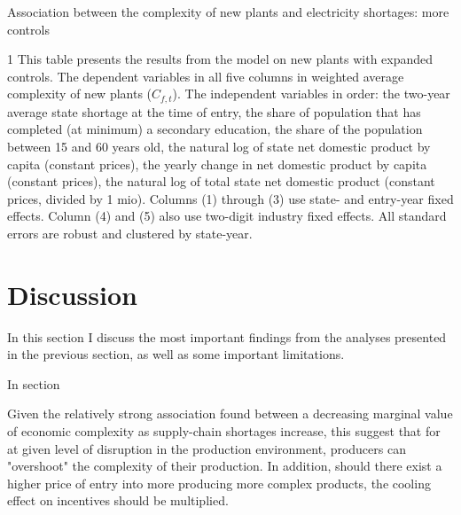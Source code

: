 \documentclass[11pt]{article}
\begin{document}
\begin{table} 
	\begin{center}
		\begin{threeparttable}
			\caption{Association between the complexity of new plants and electricity shortages: more controls}
			\label{tab:entry_max_avg}
			
			\begin{tablenotes} \footnotesize 
			\item[1] This table presents the results from the model on new plants with expanded controls. The dependent variables in all five columns in weighted average complexity of new plants ($C_{f,t}$). The independent variables in order: the two-year average state shortage at the time of entry, the share of population that has completed (at minimum) a secondary education, the share of the population between 15 and 60 years old, the natural log of state net domestic product by capita (constant prices), the yearly change in net domestic product by capita (constant prices), the natural log of total state net domestic product (constant prices, divided by 1 mio). Columns (1) through (3) use state- and entry-year fixed effects. Column (4) and (5) also use two-digit industry fixed effects. All standard errors are robust and clustered by state-year.
			\end{tablenotes}
		\end{threeparttable}
	\end{center}
\end{table}   



\newpage


\section{Discussion}%
\label{sec:discussion}
In this section I discuss the most important findings from the analyses presented in the previous section, as well as some important limitations.

In section


Given the relatively strong association found between a decreasing marginal value of economic complexity as supply-chain shortages increase, this suggest that for at given level of disruption in the production environment, producers can "overshoot" the complexity of their production. In addition, should there exist a higher price of entry into more producing more complex products, the cooling effect on incentives should be multiplied. 
\end{document}
